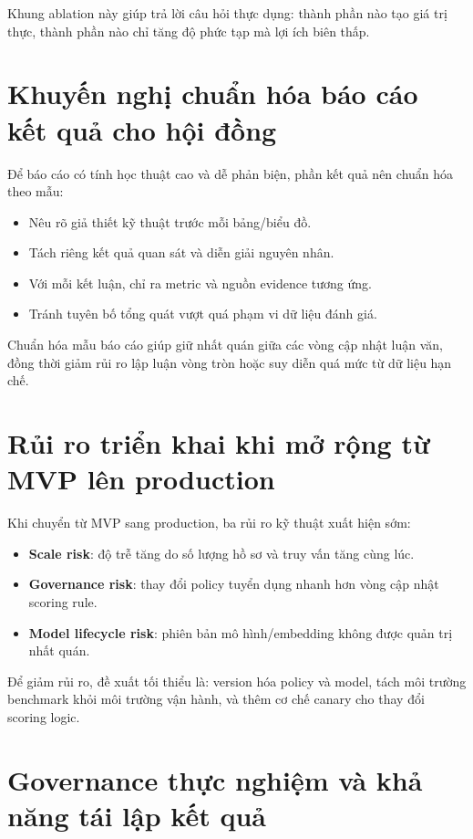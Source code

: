 Khung ablation này giúp trả lời câu hỏi thực dụng: thành phần nào tạo giá trị thực, thành phần nào chỉ tăng độ phức tạp mà lợi ích biên thấp.

\section{Khuyến nghị chuẩn hóa báo cáo kết quả cho hội đồng}

Để báo cáo có tính học thuật cao và dễ phản biện, phần kết quả nên chuẩn hóa theo mẫu:

\begin{itemize}
  \item Nêu rõ giả thiết kỹ thuật trước mỗi bảng/biểu đồ.
  \item Tách riêng kết quả quan sát và diễn giải nguyên nhân.
  \item Với mỗi kết luận, chỉ ra metric và nguồn evidence tương ứng.
  \item Tránh tuyên bố tổng quát vượt quá phạm vi dữ liệu đánh giá.
\end{itemize}

Chuẩn hóa mẫu báo cáo giúp giữ nhất quán giữa các vòng cập nhật luận văn, đồng thời giảm rủi ro lập luận vòng tròn hoặc suy diễn quá mức từ dữ liệu hạn chế.

\section{Rủi ro triển khai khi mở rộng từ MVP lên production}

Khi chuyển từ MVP sang production, ba rủi ro kỹ thuật xuất hiện sớm:

\begin{itemize}
  \item \textbf{Scale risk}: độ trễ tăng do số lượng hồ sơ và truy vấn tăng cùng lúc.
  \item \textbf{Governance risk}: thay đổi policy tuyển dụng nhanh hơn vòng cập nhật scoring rule.
  \item \textbf{Model lifecycle risk}: phiên bản mô hình/embedding không được quản trị nhất quán.
\end{itemize}

Để giảm rủi ro, đề xuất tối thiểu là: version hóa policy và model, tách môi trường benchmark khỏi môi trường vận hành, và thêm cơ chế canary cho thay đổi scoring logic.

\section{Governance thực nghiệm và khả năng tái lập kết quả}

